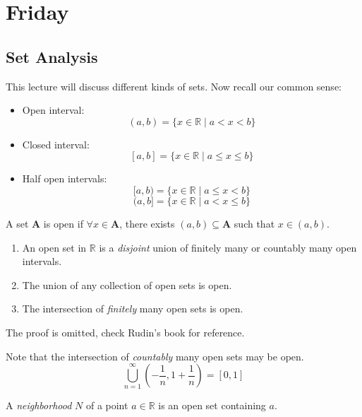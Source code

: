 

\section{Friday}
\subsection{Set Analysis}
This lecture will discuss different kinds of sets. Now recall our common sense:
\begin{definition}[Interval]
\begin{itemize}
\item
Open interval:
\[
(a,b) = \{x\in\mathbb{R}\mid a<x<b\}
\]
\item
Closed interval:
\[
[a,b] = \{x\in\mathbb{R}\mid a\le x\le b\}
\]
\item
Half open intervals:
\[
[a,b)=\{x\in\mathbb{R}\mid a\le x< b\}
\]
\[
(a,b] = \{x\in\mathbb{R}\mid a< x\le b\}
\]
\end{itemize}
\end{definition}
\begin{definition}
A set $\bm A$ is open if $\forall x\in\bm A$, there exists $(a,b)\subseteq\bm A$ such that $x\in(a,b)$.
\end{definition}

\begin{theorem}
\begin{enumerate}
\item
An open set in $\mathbb{R}$ is a \emph{disjoint} union of finitely many or countably many open intervals.
\item
The union of any collection of open sets is open.
\item
The intersection of \emph{finitely} many open sets is open.
\end{enumerate}
\end{theorem}
The proof is omitted, check Rudin's book for reference.
\begin{remark}
Note that the intersection of \emph{countably} many open sets may be open.
 \[
 \bigcup_{n=1}^\infty\left(-\frac{1}{n},1+\frac{1}{n}\right)
 =[0,1]
 \]
\end{remark}

\begin{definition}[Neighborhood]
A \emph{neighborhood} $N$ of a point $a\in\mathbb{R}$ is an open set containing $a$.
\end{definition}


